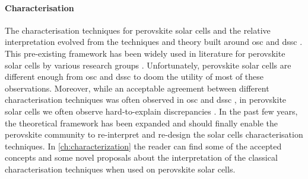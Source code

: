 	\paragraph{Characterisation}
	The characterisation techniques for perovskite solar cells and the relative interpretation evolved from the techniques and theory built around \gls{osc} and \gls{dssc} \cite{Barnes2013}.
	This pre-existing framework has been widely used in literature for perovskite solar cells by various research groups \cite{ORegan2015b,Shao2016,Gelmetti2019,Kiermasch2018,Carnie2015}.
	Unfortunately, perovskite solar cells are different enough from \gls{osc} and \gls{dssc} to doom the utility of most of these observations.
	Moreover, while an acceptable agreement between different characterisation techniques was often observed in \gls{osc} \cite{Clarke2015,Maurano2011,Foertig2012} and \gls{dssc} \cite{Barnes2013}, in perovskite solar cells we often observe hard-to-explain discrepancies \cite{Kiermasch2018}.
	In the past few years, the theoretical framework has been expanded and should finally enable the perovskite community to re-interpret and re-design the solar cells characterisation techniques.
	In \cref{ch:characterization} the reader can find some of the accepted concepts and some novel proposals about the interpretation of the classical characterisation techniques when used on perovskite solar cells.

